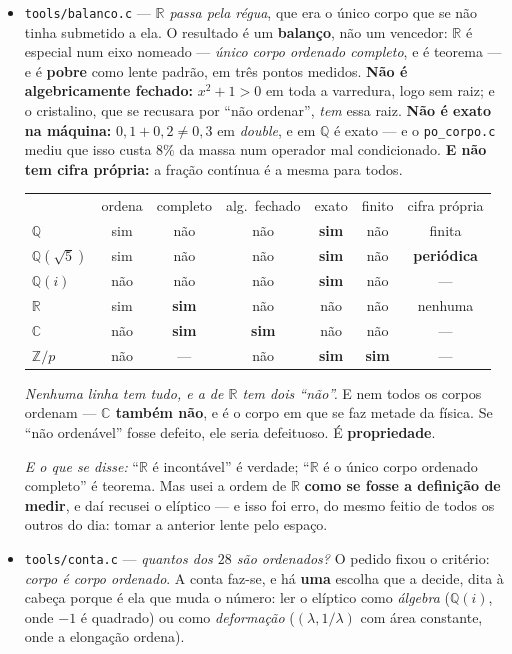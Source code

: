 \documentclass[11pt]{article}
\newcommand{\code}[1]{\texttt{\small #1}}
\newcommand{\Z}{\mathbb Z}
\newcommand{\R}{\mathbb R}
\newcommand{\Q}{\mathbb Q}
\newcommand{\C}{\mathbb C}
\theoremstyle{plain}
\theoremstyle{remark}
\begin{document}
\begin{itemize}
(Um erro de leitura no caminho, apanhado antes de afirmar: a primeira versão de \code{cf\_quad} retornava
ao detetar o período e deixava o resto do vetor com \emph{lixo da chamada anterior} --- $\sqrt2$
saía $[1;2,1,2]$. Corrigido: preenche-se sempre, e o período só se regista.)
\item \code{tools/balanco.c} --- \emph{$\R$ passa pela régua}, que era o único corpo que se não
tinha submetido a ela. O resultado é um \textbf{balanço}, não um vencedor: $\R$ é especial num eixo
nomeado --- \emph{único corpo ordenado completo}, e é teorema --- e é \textbf{pobre} como lente
padrão, em três pontos medidos. \textbf{Não é algebricamente fechado:} $x^2+1 > 0$ em toda a
varredura, logo sem raiz; e o cristalino, que se recusara por ``não ordenar'', \emph{tem} essa
raiz. \textbf{Não é exato na máquina:} $0{,}1+0{,}2 \neq 0{,}3$ em \emph{double}, e em $\Q$ é
exato --- e o \code{po\_corpo.c} mediu que isso custa $8\%$ da massa num operador mal
condicionado. \textbf{E não tem cifra própria:} a fração contínua é a mesma para todos.

\begin{center}\begin{tabular}{lcccccc}
& ordena & completo & alg.\ fechado & exato & finito & cifra própria \\
$\Q$ & sim & não & não & \textbf{sim} & não & finita \\
$\Q(\sqrt5)$ & sim & não & não & \textbf{sim} & não & \textbf{periódica} \\
$\Q(i)$ & não & não & não & \textbf{sim} & não & --- \\
$\R$ & sim & \textbf{sim} & não & não & não & nenhuma \\
$\C$ & não & \textbf{sim} & \textbf{sim} & não & não & --- \\
$\Z/p$ & não & --- & não & \textbf{sim} & \textbf{sim} & --- \\
\end{tabular}\end{center}

\emph{Nenhuma linha tem tudo, e a de $\R$ tem dois ``não''.} E nem todos os corpos ordenam ---
\textbf{$\C$ também não}, e é o corpo em que se faz metade da física. Se ``não ordenável'' fosse
defeito, ele seria defeituoso. É \textbf{propriedade}.

\emph{E o que se disse:} ``$\R$ é incontável'' é verdade; ``$\R$ é o único corpo ordenado
completo'' é teorema. Mas usei a ordem de $\R$ \textbf{como se fosse a definição de medir}, e daí
recusei o elíptico --- e isso foi erro, do mesmo feitio de todos os outros do dia: tomar a anterior
lente pelo espaço.
\item \code{tools/conta.c} --- \emph{quantos dos $28$ são ordenados?} O pedido fixou o critério:
\emph{corpo é corpo ordenado}. A conta faz-se, e há \textbf{uma} escolha que a decide, dita à
cabeça porque é ela que muda o número: ler o elíptico como \emph{álgebra} ($\Q(i)$, onde $-1$ é
quadrado) ou como \emph{deformação} ($(\lambda,1/\lambda)$ com área constante, onde a elongação
ordena).


\end{itemize}
\end{document}
